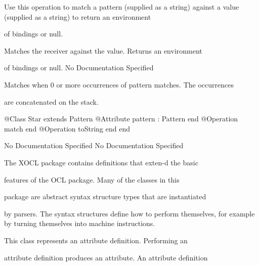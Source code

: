         Use this operation to match a pattern (supplied as a string)
        against a value (supplied as a string) to return an environment

        of bindings or null.

        Matches the receiver against the value. Returns an environment

        of bindings or null.
No Documentation Specified

      Matches when 0 or more occurrences of pattern matches. The occurrences

      are concatenated on the stack.
\begin{Interface}
@Class Star extends Pattern
  @Attribute pattern : Pattern end
  @Operation match end
  @Operation toString end
end
\end{Interface}
No Documentation Specified
No Documentation Specified

      The XOCL package contains definitions that exten-d the basic

      features of the OCL package. Many of the classes in this

      package are abstract syntax structure types that are instantiated

      by parsers. The syntax structures define how to perform themselves,
      for example by turning themselves into machine instructions.

        This class represents an attribute definition. Performing an

        attribute definition produces an attribute. An attribute definition

